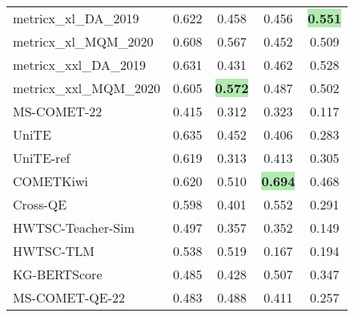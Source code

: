 \documentclass[11pt]{article}
\begin{document}
\begin{table}[ht]
\begin{tabular}{@{}lcccc@{}}
metricx\_xl\_DA\_2019   & \phantom{-}0.622  & \phantom{-}0.458                   & \phantom{-}0.456                   & \colorbox[HTML]{B2EAB1}{\textbf{\phantom{-}0.551}}                   \\
metricx\_xl\_MQM\_2020  & \phantom{-}0.608  & \phantom{-}0.567                   & \phantom{-}0.452                   & \phantom{-}0.509                   \\
metricx\_xxl\_DA\_2019  & \phantom{-}0.631  & \phantom{-}0.431                   & \phantom{-}0.462                   & \phantom{-}0.528                   \\
metricx\_xxl\_MQM\_2020 & \phantom{-}0.605  & \colorbox[HTML]{B2EAB1}{\textbf{\phantom{-}0.572}}                   & \phantom{-}0.487                   & \phantom{-}0.502                   \\
MS-COMET-22             & \phantom{-}0.415  & \phantom{-}0.312                   & \phantom{-}0.323                   & \phantom{-}0.117                   \\
UniTE                   & \phantom{-}0.635  & \phantom{-}0.452                   & \phantom{-}0.406                   & \phantom{-}0.283                   \\
UniTE-ref               & \phantom{-}0.619  & \phantom{-}0.313                   & \phantom{-}0.413                   & \phantom{-}0.305                   \\ \midrule
COMETKiwi               & \phantom{-}0.620  & \phantom{-}0.510                   & \colorbox[HTML]{B2EAB1}{\textbf{\phantom{-}0.694}}                   & \phantom{-}0.468                   \\
Cross-QE                & \phantom{-}0.598  & \phantom{-}0.401                   & \phantom{-}0.552                   & \phantom{-}0.291                   \\
HWTSC-Teacher-Sim       & \phantom{-}0.497  & \phantom{-}0.357                   & \phantom{-}0.352                   & \phantom{-}0.149                   \\
HWTSC-TLM               & \phantom{-}0.538  & \phantom{-}0.519                   & \phantom{-}0.167                   & \phantom{-}0.194                   \\
KG-BERTScore            & \phantom{-}0.485  & \phantom{-}0.428                   & \phantom{-}0.507                   & \phantom{-}0.347                   \\
MS-COMET-QE-22          & \phantom{-}0.483  & \phantom{-}0.488                   & \phantom{-}0.411                   & \phantom{-}0.257                   \\

\end{tabular}
\end{table}
\end{document}

